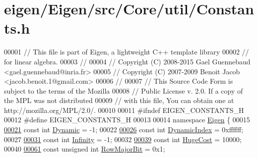 \hypertarget{eigen_2_eigen_2src_2_core_2util_2_constants_8h_source}{}\section{eigen/\+Eigen/src/\+Core/util/\+Constants.h}
\label{eigen_2_eigen_2src_2_core_2util_2_constants_8h_source}

\begin{DoxyCode}
00001 \textcolor{comment}{// This file is part of Eigen, a lightweight C++ template library}
00002 \textcolor{comment}{// for linear algebra.}
00003 \textcolor{comment}{//}
00004 \textcolor{comment}{// Copyright (C) 2008-2015 Gael Guennebaud <gael.guennebaud@inria.fr>}
00005 \textcolor{comment}{// Copyright (C) 2007-2009 Benoit Jacob <jacob.benoit.1@gmail.com>}
00006 \textcolor{comment}{//}
00007 \textcolor{comment}{// This Source Code Form is subject to the terms of the Mozilla}
00008 \textcolor{comment}{// Public License v. 2.0. If a copy of the MPL was not distributed}
00009 \textcolor{comment}{// with this file, You can obtain one at http://mozilla.org/MPL/2.0/.}
00010 
00011 \textcolor{preprocessor}{#ifndef EIGEN\_CONSTANTS\_H}
00012 \textcolor{preprocessor}{#define EIGEN\_CONSTANTS\_H}
00013 
00014 \textcolor{keyword}{namespace }\hyperlink{namespace_eigen}{Eigen} \{
00015 
\hyperlink{namespace_eigen_ad81fa7195215a0ce30017dfac309f0b2}{00021} \textcolor{keyword}{const} \textcolor{keywordtype}{int} \hyperlink{namespace_eigen_ad81fa7195215a0ce30017dfac309f0b2}{Dynamic} = -1;
00022 
\hyperlink{namespace_eigen_a73c597189a4a99127175e8167c456fff}{00026} \textcolor{keyword}{const} \textcolor{keywordtype}{int} \hyperlink{namespace_eigen_a73c597189a4a99127175e8167c456fff}{DynamicIndex} = 0xffffff;
00027 
\hyperlink{namespace_eigen_a7951593b031e13d90223c83d022ce99e}{00031} \textcolor{keyword}{const} \textcolor{keywordtype}{int} \hyperlink{namespace_eigen_a7951593b031e13d90223c83d022ce99e}{Infinity} = -1;
00032 
\hyperlink{namespace_eigen_a3163430a1c13173faffde69016b48aaf}{00039} \textcolor{keyword}{const} \textcolor{keywordtype}{int} \hyperlink{namespace_eigen_a3163430a1c13173faffde69016b48aaf}{HugeCost} = 10000;
00040 
\hyperlink{group__flags_gae4f56c2a60bbe4bd2e44c5b19cbe8762}{00061} \textcolor{keyword}{const} \textcolor{keywordtype}{unsigned} \textcolor{keywordtype}{int} \hyperlink{group__flags_gae4f56c2a60bbe4bd2e44c5b19cbe8762}{RowMajorBit} = 0x1;

\end{DoxyCode}
